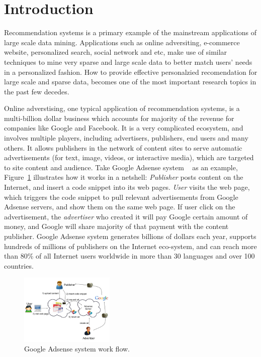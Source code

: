 \section{Introduction}
\label{sec:intro}

Recommendation systems is a primary example of the mainstream
applications of large scale data mining.  Applications such as online
adversiting, e-commerce website, personalized search, social network
and etc, make use of similar techniques to mine very sparse and large
scale data to better match users’ needs in a personalized fashion.
How to provide effective personalzied recomendation for large scale
and sparse data, becomes one of the most important research topics in
the past few decedes.


Online adverstising, one typical application of recommendation
systems, is a multi-billion dollar business which accounts for
majority of the revenue for companies like Google and Facebook. It is
a very complicated ecosystem, and involves multiple players, including
advertisers, publishers, end users and many others.  It allows
publishers in the network of content sites to serve automatic
advertisements (for text, image, videos, or interactive media), which
are targeted to site content and audience.
%
Take Google Adsense system ~\cite{adsense:wiki} as an example,
Figure~\ref{fig:adsense} illustrates how it works in a netshell: {\em
  Publisher} posts content on the Internet, and insert a code snippet
into its web pages. {\em User} visits the web page, which triggers the
code snippet to pull relevant advertisements from Google Adsense
servers, and show them on the same web page.  If user click on the
advertisement, the {\em advertiser} who created it will pay Google
certain amount of money, and Google will share majority of that
payment with the content publisher.
%
Google Adsense system generates billions of dollars each year,
supports hundreds of millions of publishers on the Internet
eco-system, and can reach more than 80\% of all Internet users
worldwide in more than 30 languages and over 100 countries.
%

\begin{figure}[!ht]
  \centering
  \includegraphics[width=0.4\textwidth]{figures/adsense.jpg}
  \caption{Google Adsense system work flow.}
  \label{fig:adsense}
\end{figure}

